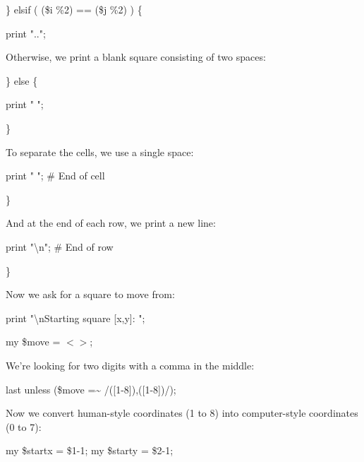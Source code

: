 \documentclass[a4paper,11pt]{book}
\begin{document}
\noindent 

\noindent 

\noindent \} elsif ( (\$i \%2) == (\$j \%2) ) \{

\noindent print "..";

\noindent 

\noindent Otherwise, we print a blank square consisting of two spaces:

\noindent 

\noindent 

\noindent \} else \{

\noindent print "  ";

\noindent \}

\noindent 

\noindent To separate the cells, we use a single space:

\noindent 

\noindent print " ";  \# End of cell

\noindent \}

\noindent 

\noindent And at the end of each row, we print a new line:

\noindent 

\noindent print "\textbackslash n"; \# End of row

\noindent \}

\noindent 

\noindent 

\noindent Now we ask for a square to move from:

\noindent 

\noindent 

\noindent print "\textbackslash nStarting square [x,y]: ";

\noindent my \$move = $<$$>$;

\noindent 

\noindent We're looking for two digits with a comma in the middle:

\noindent 

\noindent 

\noindent last unless (\$move =\~{} /([1-8]),([1-8])/);

\noindent 

\noindent Now we convert human-style coordinates (1 to 8) into computer-style coordinates (0 to 7):

\noindent 

\noindent 

\noindent my \$startx = \$1-1; my \$starty = \$2-1;
\end{document}
